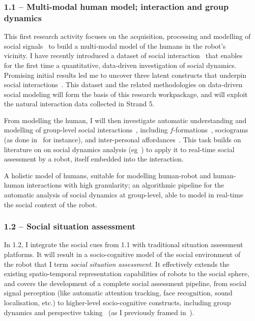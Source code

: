 \subsubsection{1.1 -- Multi-modal human model; interaction and group dynamics}

This first research activity focuses on the acquisition, processing and modelling of social
signals~\parencite{gunes2017automatic} to build a multi-modal model of the humans
in the robot's vicinity. I have recently introduced a dataset of social
interaction~\parencite{lemaignan2018pinsoro} that enables for the first time a
quantitative, data-driven investigation of social dynamics. Promising initial
results led me to uncover three latent constructs that underpin social
interactions~\parencite{bartlett2019what}. This dataset and the related methodologies
on data-driven social modeling will form the basis of this research workpackage,
and will exploit the natural interaction data collected in Strand 5.


From modelling the human, I will then investigate automatic understanding and
modelling of group-level social interactions~\parencite{tapus2019perceiving},
including $f$-formations~\parencite{marshall2011using}, sociograms (as done
in~\textcite{garcia2016hybrid} for instance), and inter-personal
affordances~\parencite{pandey2013affordance}. This task builds on literature on
on social dynamics analysis
(eg~\parencite{durantin2017social,jermann2009physical, martinez2019collocated})
to apply it to real-time social assessment by a robot, itself embedded into the
interaction.

\begin{outcome}{1.1}
    A holistic model of humans, suitable for modelling human-robot and
    human-human interactions with high granularity; an algorithmic pipeline for
    the automatic analysis of social dynamics at group-level, able to model in
    real-time the social context of the robot.
\end{outcome}


\subsubsection{1.2 -- Social situation assessment}


In 1.2, I integrate the social
cues from 1.1 with traditional situation assessment platforms. It will
result in a socio-cognitive model of the social environment of the robot that I
term \emph{social situation assessment}. It effectively extends the
existing spatio-temporal representation capabilities of robots to the social
sphere, and covers the development of a complete social assessment pipeline,
from social signal perception (like automatic attention tracking, face
recognition, sound localisation, etc.) to higher-level socio-cognitive
constructs, including group dynamics and perspective
taking~\parencite{flavell1992perspectives} (as I previously framed
in~\textcite{lemaignan2015mutual, dillenbourg2016symmetry}).

